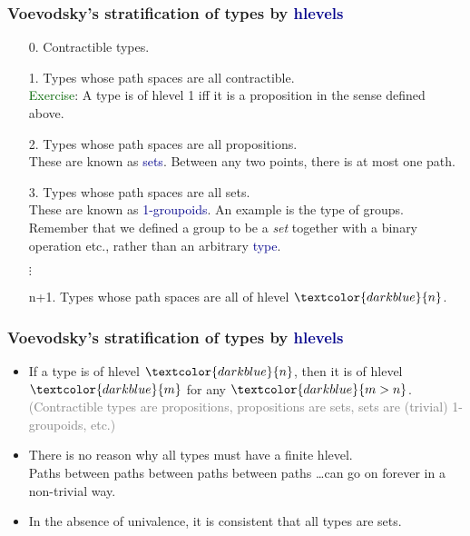 \documentclass[aspectratio=169]{beamer}
\newcommand{\db}{\textcolor{darkblue}}
\newcommand{\dg}{\textcolor{darkgreen}}
\newcommand{\grey}{\textcolor{grey}}
\newcommand{\m}[1]{$\db{#1}$}
\begin{document}
 \begin{frame}
   \frametitle{Voevodsky's stratification of types by \db{hlevels}}

   \begin{enumerate}
   \vfill \item[0.] Contractible types.
   \vfill \item[1.] Types whose path spaces are all contractible. \\[1ex]

   \dg{Exercise}: A type is of hlevel 1 iff it is a proposition in the sense defined above.

     \vfill \item[2.] Types whose path spaces are all propositions. \\[1ex]

     These are known as \db{sets}. Between any two points, there is at most one path.

     \vfill \item[3.] Types whose path spaces are all sets. \\[1ex]

     These are known as \db{1-groupoids}. An example is the type of groups. \\[1ex]

     Remember that we defined a group to be a \emph{set} together with a binary operation etc., rather than an arbitrary \db{type}.

$\vdots$
       
       \vfill \item[n+1.] Types whose path spaces are all of hlevel \m{n}.
       
    
   \end{enumerate}

   
   
 \end{frame}

 \begin{frame}
   \frametitle{Voevodsky's stratification of types by \db{hlevels}}

   \begin{itemize}
   \vfill \item If a type is of hlevel \m{n}, then it is of hlevel \m{m} for any \m{m>n}. \\[1ex]

     \grey{(Contractible types are propositions, propositions are sets, sets are (trivial) 1-groupoids, etc.)}


     \vfill \item There is no reason why all types must have a finite hlevel. \\[1ex] Paths between paths between paths between paths \dots can go on forever in a non-trivial way.
     
   \vfill \item In the absence of univalence, it is consistent that all types are sets.  
   \end{itemize}
   
 \end{frame}
\end{document}

